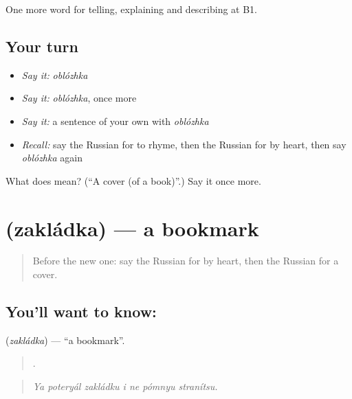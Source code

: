 \begin{grammarlens}[title={What you've built}]
One more word for telling, explaining and describing at B1.
\end{grammarlens}

\subsection*{Your turn}
\begin{itemize}
\raggedright
  \item \emph{Say it:} \emph{oblózhka}
  \item \emph{Say it:} \emph{oblózhka}, once more
  \item \emph{Say it:} a sentence of your own with \emph{oblózhka}
  \item \emph{Recall:} say the Russian for to rhyme, then the Russian for by heart, then say \emph{oblózhka} again
\end{itemize}

\begin{tcolorbox}[breakable,colback=teal!4,colframe=teal!35!black,title={Before you move on}]
What does  mean? (\textquotedblleft{}A cover (of a book)\textquotedblright{}.) Say it once more.
\end{tcolorbox}
\section[\texorpdfstring{\ru{закладка} (zakládka)}{закладка (zakládka)}]{ (zakládka) — a bookmark}

\label{lesson:RU-C526-zakladka}



\begin{quote}
Before the new one: say the Russian for by heart, then the Russian for a cover.
\end{quote}

\subsection*{You'll want to know: }
\textbf{} (\emph{zakládka}) — \textquotedblleft{}a bookmark\textquotedblright{}.

\begin{quote}
      .
\end{quote}

\begin{quote}
\emph{Ya poteryál zakládku i ne pómnyu stranítsu.}
\end{quote}

